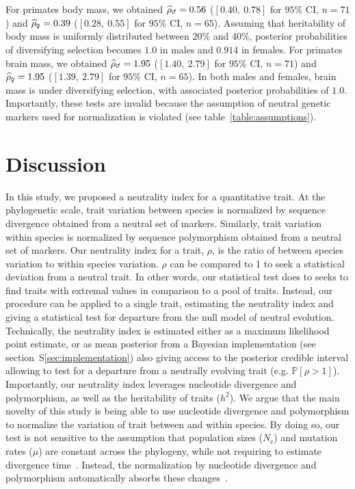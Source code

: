 \documentclass{article}
\newcommand{\Ne}{N_{\text{e}}}
\newcommand{\proba}{\mathbb{P}}
\newcommand{\NbrTaxa}{n}
\newcommand{\Heritability}{h^2}
\newcommand{\MutationRate}{\mu}
\newcommand{\NI}{\rho}
\newcommand{\EstNI}{\widehat{\rho}}
\begin{document}
For primates body mass, we obtained $\EstNI_{\text{\Male}} = 0.56$ ($[0.40,~0.78]$ for $95\%$ CI, $\NbrTaxa=71$) and $\EstNI_{\text{\Female}} = 0.39$ ($[0.28,~0.55]$ for $95\%$ CI, $\NbrTaxa=65$).
Assuming that heritability of body mass is uniformly distributed between 20\% and 40\%, posterior probabilities of diversifying selection becomes $1.0$ in males and $0.914$ in females.
For primates brain mass, we obtained $\EstNI_{\text{\Male}} = 1.95$ ($[1.40,~2.79]$ for $95\%$ CI, $\NbrTaxa=71$) and $\EstNI_{\text{\Female}} = 1.95$ ($[1.39,~2.79]$ for $95\%$ CI, $\NbrTaxa=65$).
In both males and females, brain mass is under diversifying selection, with associated posterior probabilities of $1.0$.
Importantly, these tests are invalid because the assumption of neutral genetic markers used for normalization is violated (see table~\ref{table:assumptions}).

\section*{Discussion}\label{sec:discussion}

In this study, we proposed a neutrality index for a quantitative trait.
At the phylogenetic scale, trait variation between species is normalized by sequence divergence obtained from a neutral set of markers.
Similarly, trait variation within species is normalized by sequence polymorphism obtained from a neutral set of markers.
Our neutrality index for a trait, $\NI$, is the ratio of between species variation to within species variation.
$\NI$ can be compared to 1 to seek a statistical deviation from a neutral trait.
In other words, our statistical test does to seeks to find traits with extremal values in comparison to a pool of traits.
Instead, our procedure can be applied to a single trait, estimating the neutrality index and giving a statistical test for departure from the null model of neutral evolution.
Technically, the neutrality index is estimated either as a maximum likelihood point estimate, or as mean posterior from a Bayesian implementation (see section~S\ref{sec:implementation}) also giving access to the posterior credible interval allowing to test for a departure from a neutrally evolving trait (e.g. $ \proba [ \NI > 1 ]$).
Importantly, our neutrality index leverages nucleotide divergence and polymorphism, as well as the heritability of traits ($\Heritability$).
We argue that the main novelty of this study is being able to use nucleotide divergence and polymorphism to normalize the variation of trait between and within species.
By doing so, our test is not sensitive to the assumption that population sizes ($\Ne$) and mutation rates ($\MutationRate$) are constant across the phylogeny, while not requiring to estimate divergence time~\cite{litsios_effects_2012}.
Instead, the normalization by nucleotide divergence and polymorphism automatically absorbs these changes~\cite{seo_estimating_2004}.
\end{document}
